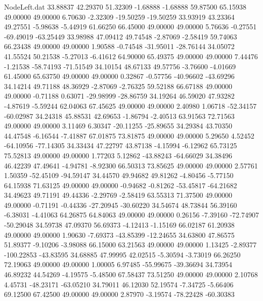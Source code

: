 \begin{filecontents}{NodeLeft.dat}
  33.88837   42.29370   51.32309    -1.68888   -1.68888   59.87500   65.15938   49.00000   49.00000    6.70630   -2.32309  -19.50259  -19.50259
  33.93919   43.23364   49.27551    -5.98638   -5.44919   61.66250   66.45000   49.00000   49.00000    5.76636   -0.27551  -69.49019  -63.25449
  33.98988   47.09412   49.74548    -2.87069   -2.58419   59.74063   66.23438   49.00000   49.00000    1.90588   -0.74548  -31.95011  -28.76144
  34.05072   41.55524   50.21538    -5.27013   -6.41612   64.90000   65.49375   49.00000   49.00000    7.44476   -1.21538  -58.74193  -71.51549
  34.10154   48.67133   49.57756    -3.76600   -4.01669   61.45000   65.63750   49.00000   49.00000    0.32867   -0.57756  -40.96602  -43.69296
  34.14214   49.71188   48.36929    -2.87069   -2.76325   59.52188   66.67188   49.00000   49.00000   -0.71188    0.63071  -29.98999  -28.86759
  34.19264   46.59020   47.93282    -4.87619   -5.59244   62.04063   67.45625   49.00000   49.00000    2.40980    1.06718  -52.34157  -60.02987
  34.24318   45.88531   42.69653    -1.86794   -2.40513   63.91563   72.71563   49.00000   49.00000    3.11469    6.30347  -20.11255  -25.89655
  34.29384   43.70350   44.47548    -6.16544   -7.41887   67.01875   73.81875   49.00000   49.00000    5.29650    4.52452  -64.10956  -77.14305
  34.33434   47.22797   43.87138    -4.15994   -6.12962   65.73125   75.52813   49.00000   49.00000    1.77203    5.12862  -43.88243  -64.66029
  34.38496   46.42239   47.49641    -4.94781   -8.92300   66.50313   73.85625   49.00000   49.00000    2.57761    1.50359  -52.45109  -94.59147
  34.44570   49.94682   49.81262    -4.80456   -5.77150   64.15938   71.63125   49.00000   49.00000   -0.94682   -0.81262  -53.45817  -64.21682
  34.49623   49.71191   49.44336    -2.29769   -2.58419   63.55313   71.37500   49.00000   49.00000   -0.71191   -0.44336  -27.20945  -30.60220
  34.54674   48.73844   56.39160    -6.38031   -4.41063   64.26875   64.84063   49.00000   49.00000    0.26156   -7.39160  -72.74907  -50.29048
  34.59738   47.09370   56.69373    -4.12413   -1.15169   66.02187   61.20938   49.00000   49.00000    1.90630   -7.69373  -43.85399  -12.24655
  34.63800   47.86575   51.89377    -9.10206   -3.98088   66.15000   63.21563   49.00000   49.00000    1.13425   -2.89377 -100.22853  -43.83595
  34.68885   47.99995   42.02515    -5.30594   -3.73019   66.26250   72.19063   49.00000   49.00000    1.00005    6.97485  -55.99675  -39.36694
  34.73954   46.89232   44.54269    -4.19575   -5.48500   67.58437   73.51250   49.00000   49.00000    2.10768    4.45731  -48.23171  -63.05210
  34.79011   46.12030   52.19574    -7.34725   -5.66406   69.12500   67.42500   49.00000   49.00000    2.87970   -3.19574  -78.22428  -60.30383

\end{filecontents}
